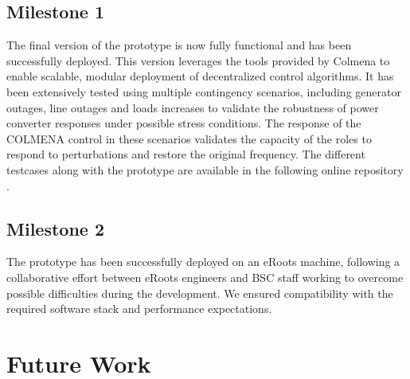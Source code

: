 \documentclass{article}
\begin{document}
\subsection*{Milestone 1}

The final version of the prototype is now fully functional and has been successfully deployed. This version leverages the tools provided by Colmena to enable scalable, modular deployment of decentralized control algorithms. It has been extensively tested using multiple contingency scenarios, including generator outages, line outages and loads increases to validate the robustness of power converter responses under possible stress conditions. The response of the COLMENA control in these scenarios validates the capacity of the roles to respond to perturbations and restore the original frequency. The different testcases along with the prototype are available in the following online repository \cite{repo:colmenaeroots}.
\subsection*{Milestone 2}

The prototype has been successfully deployed on an eRoots machine, following a collaborative effort between eRoots engineers and BSC staff working to overcome possible difficulties during the development. We ensured compatibility with the required software stack and performance expectations.

\section{Future Work}


\printbibliography
\end{document}
